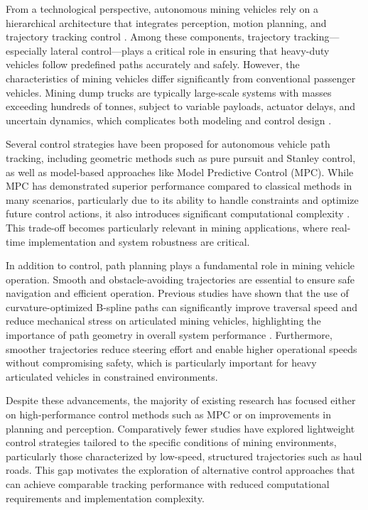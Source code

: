 \documentclass{ifacconf}
\begin{document}
From a technological perspective, autonomous mining vehicles rely on a hierarchical architecture that integrates perception, motion planning, and trajectory tracking control \cite{refChen2023}. Among these components, trajectory tracking—especially lateral control—plays a critical role in ensuring that heavy-duty vehicles follow predefined paths accurately and safely. However, the characteristics of mining vehicles differ significantly from conventional passenger vehicles. Mining dump trucks are typically large-scale systems with masses exceeding hundreds of tonnes, subject to variable payloads, actuator delays, and uncertain dynamics, which complicates both modeling and control design \cite{refChen2023}.

Several control strategies have been proposed for autonomous vehicle path tracking, including geometric methods such as pure pursuit and Stanley control, as well as model-based approaches like Model Predictive Control (MPC). While MPC has demonstrated superior performance compared to classical methods in many scenarios, particularly due to its ability to handle constraints and optimize future control actions, it also introduces significant computational complexity \cite{refIFACDumpTruck}. This trade-off becomes particularly relevant in mining applications, where real-time implementation and system robustness are critical.

In addition to control, path planning plays a fundamental role in mining vehicle operation. Smooth and obstacle-avoiding trajectories are essential to ensure safe navigation and efficient operation. Previous studies have shown that the use of curvature-optimized B-spline paths can significantly improve traversal speed and reduce mechanical stress on articulated mining vehicles, highlighting the importance of path geometry in overall system performance \cite{refBSpline}. Furthermore, smoother trajectories reduce steering effort and enable higher operational speeds without compromising safety, which is particularly important for heavy articulated vehicles in constrained environments.

Despite these advancements, the majority of existing research has focused either on high-performance control methods such as MPC or on improvements in planning and perception. Comparatively fewer studies have explored lightweight control strategies tailored to the specific conditions of mining environments, particularly those characterized by low-speed, structured trajectories such as haul roads. This gap motivates the exploration of alternative control approaches that can achieve comparable tracking performance with reduced computational requirements and implementation complexity.
\end{document}
